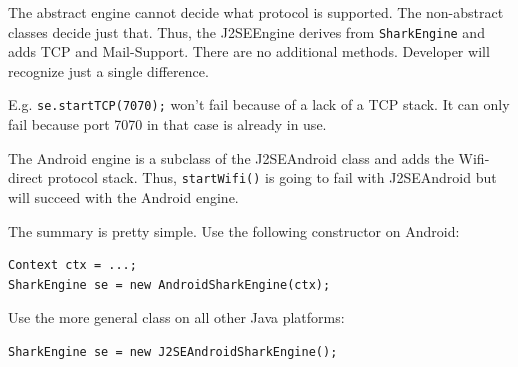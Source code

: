 The abstract engine cannot decide what protocol is supported. The non-abstract classes decide just that. Thus, the J2SEEngine derives from {\tt SharkEngine} and adds TCP and Mail-Support. There are no additional methods. Developer will recognize just a single difference.

E.g. {\tt se.startTCP(7070);} won't fail because of a lack of a TCP stack.
It can only fail because port 7070 in that case is already in use.

The Android engine is a subclass of the J2SEAndroid class and adds the Wifi-direct protocol stack. Thus, {\tt startWifi()} is going to fail with J2SEAndroid but will succeed with the Android engine.

The summary is pretty simple. Use the following constructor on Android:

\begin{verbatim}
Context ctx = ...;
SharkEngine se = new AndroidSharkEngine(ctx);
\end{verbatim}

Use the more general class on all other Java platforms:

\begin{verbatim}
SharkEngine se = new J2SEAndroidSharkEngine();
\end{verbatim}
